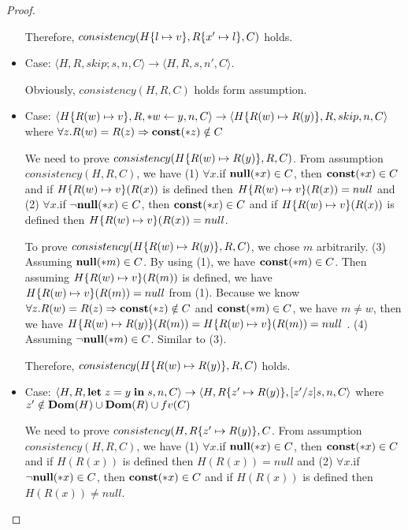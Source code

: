 \begin{proof}
\begin{itemize}
    Therefore, \(consistency(H\{l \mapsto v\}, R\{x' \mapsto l\},
    C )\) holds.

\item Case: \(\langle H, R, skip;s, n, C \rangle \rightarrow
    \langle H, R, s, n', C \rangle \).

    Obviously, \(consistency(H, R, C) \) holds form assumption.

\item Case: \(\langle H\{R(w) \mapsto v\}, R, *w \leftarrow y, n, C
  \rangle \rightarrow \langle H\{R(w) \mapsto R(y)\}, R, skip, n, C
  \rangle \) where \( \forall z. R(w) = R(z) \Rightarrow \mathbf{const}(*z)
  \notin C \)

    We need to prove \(consistency(H\{R(w) \mapsto R(y)\}, R, C)
    \). From assumption \(consistency(H, R, C)\), we have (1)
    \(\forall x\).if \({\bf null}(*x) \in C\), then \(\mathbf{const}(*x) \in C\) and
    if \(H\{R(w)\mapsto v\}(R(x))\) is defined then \(H\{R(w) \mapsto
      v\}(R(x)) = null\) and (2) \(\forall x\).if \(\neg{\bf null}(*x) \in C\),
    then \(\mathbf{const}(*x) \in C\) and if \(H\{R(w)\mapsto v\}(R(x))\) is
    defined then \(H\{R(w) \mapsto v\}(R(x)) = null\).

    To prove \(consistency(H\{R(w) \mapsto R(y)\}, R, C) \), we chose
    \(m\) arbitrarily. (3) Assuming \(\mathbf{null}(*m) \in C\). By using (1),
    we have \(\mathbf{const}(*m) \in C\). Then assuming \(H\{R(w)\mapsto
      v\}(R(m))\) is defined, we have \(H\{R(w)\mapsto v\}(R(m)) = null\)
    from (1). Because we know \( \forall z. R(w) = R(z) \Rightarrow
    \mathbf{const}(*z) \notin C \) and \(\mathbf{const}(*m) \in C\), we have \(m \ne
    w\), then we have \(H\{R(w)\mapsto R(y)\}(R(m)) = H\{R(w) \mapsto
      v\}(R(m)) = null\) . (4) Assuming \(\neg\mathbf{null}(*m) \in C\). Similar to (3).
    
    Therefore, \(consistency(H\{R(w) \mapsto R(y)\}, R, C)\) holds.

\item Case: \(\langle H, R, \mathbf{let}\; z = y \; \mathbf{in}\; s, n, C
  \rangle \rightarrow \langle H, R\{z' \mapsto R(y)\}, [z'/z]s, n, C
  \rangle \) where \(z' \notin \mathbf{Dom}(H)\cup\mathbf{Dom}(R)\cup fv(C) \)
  
  We need to prove \(consistency(H, R\{z'\mapsto R(y)\}, C \). From
  assumption \(consistency(H, R, C)\), we have (1) \(\forall x\).if
  \({\bf null}(*x) \in C\), then \(\mathbf{const}(*x) \in C\) and if \(H(R(x))\) is
  defined then \(H(R(x)) = null\) and (2) \(\forall x\).if \(\neg{\bf null}(*x)
  \in C\), then \(\mathbf{const}(*x) \in C\) and if \(H(R(x))\) is defined
  then \(H(R(x)) \ne null\).


\end{itemize}
\end{proof}
